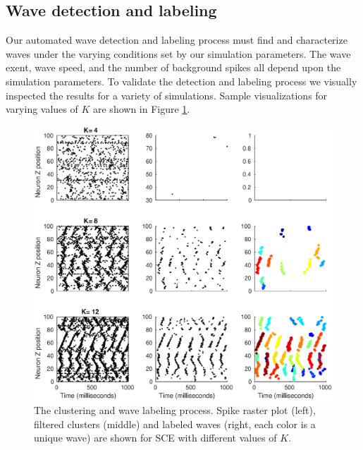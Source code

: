 \documentclass[12pt]{article}
\begin{document}
\subsection*{Wave detection and labeling}
\color{red}
Our automated wave detection and labeling process must find and characterize waves under the varying conditions set by our simulation parameters.
The wave exent, wave speed, and the number of background spikes all depend upon the simulation parameters.
To validate the detection and labeling process we visually inspected the results for a variety of simulations.
Sample visualizations for varying values of $K$ are shown in Figure \ref{fig:detector_test}.
\begin{figure}[!htb]
 \caption{The clustering and wave labeling process. Spike raster plot (left), filtered clusters (middle) and labeled waves (right, each color is a unique wave) are shown for SCE with different values of $K$. }
 \label{fig:detector_test}
 \centering
   \includegraphics[width=\textwidth]{fig/DetectorTest}
\end{figure}
\FloatBarrier
\color{black}

\color{red}
\end{document}
